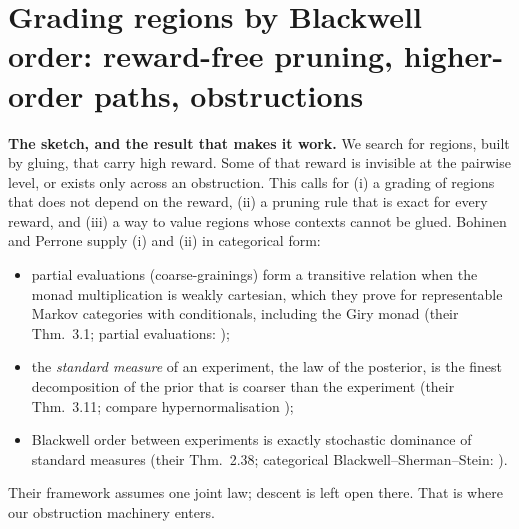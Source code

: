 \documentclass[11pt]{article}
\theoremstyle{definition}
\theoremstyle{remark}
\begin{document}
\section{Grading regions by Blackwell order: reward-free pruning, higher-order paths, obstructions}\label{sec:blackwell}
\textbf{The sketch, and the result that makes it work.} We search for regions, built by gluing, that carry high reward. Some of that reward is invisible at the pairwise level, or exists only across an obstruction. This calls for (i) a grading of regions that does not depend on the reward, (ii) a pruning rule that is exact for every reward, and (iii) a way to value regions whose contexts cannot be glued. Bohinen and Perrone \cite{bohinenperrone25} supply (i) and (ii) in categorical form:
\begin{itemize}
  \item partial evaluations (coarse-grainings) form a transitive relation when the monad multiplication is weakly cartesian, which they prove for representable Markov categories with conditionals, including the Giry monad (their Thm.~3.1; partial evaluations: \cite{fritzperrone20});
  \item the \emph{standard measure} of an experiment, the law of the posterior, is the finest decomposition of the prior that is coarser than the experiment (their Thm.~3.11; compare hypernormalisation \cite{jacobs17});
  \item Blackwell order between experiments \cite{blackwell53} is exactly stochastic dominance of standard measures (their Thm.~2.38; categorical Blackwell--Sherman--Stein: \cite{fgpr20}).
\end{itemize}
Their framework assumes one joint law; descent is left open there. That is where our obstruction machinery enters.
\end{document}
